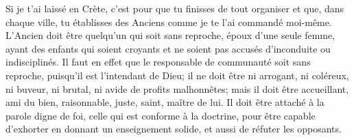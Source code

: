 Si je t’ai laissé en Crète, c’est pour que tu finisses de tout organiser
	et que, dans chaque ville, tu établisses des Anciens
	comme je te l’ai commandé moi-même.
L’Ancien doit être quelqu’un qui soit sans reproche,
	époux d’une seule femme, ayant des enfants qui soient croyants
	et ne soient pas accusés d’inconduite ou indisciplinés.
Il faut en effet que le responsable de communauté soit sans reproche,
	puisqu’il est l’intendant de Dieu;
	il ne doit être ni arrogant, ni coléreux,
	ni buveur, ni brutal, ni avide de profits malhonnêtes;
	mais il doit être accueillant, ami du bien, raisonnable, juste, saint, maître de lui.
Il doit être attaché à la parole digne de foi, celle qui est conforme à la doctrine,
	pour être capable d’exhorter en donnant un enseignement solide,
	et aussi de réfuter les opposants.
